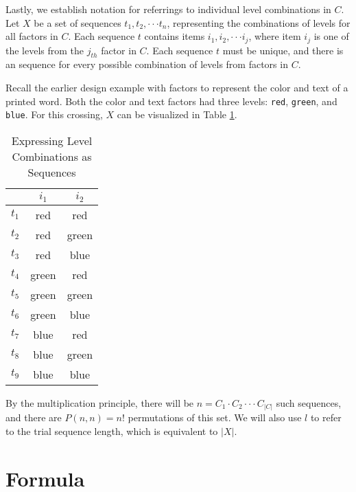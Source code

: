 Lastly, we establish notation for referrings to individual level combinations in $C$. Let $X$ be a set of sequences $t_1, t_2, \cdot\cdot\cdot t_n$, representing the combinations of levels for all factors in $C$. Each sequence $t$ contains items $i_1, i_2, \cdot\cdot\cdot i_j$, where item $i_j$ is one of the levels from the $j_{th}$ factor in $C$. Each sequence $t$ must be unique, and there is an sequence for every possible combination of levels from factors in $C$.

Recall the earlier design example with factors to represent the color and text of a printed word. Both the color and text factors had three levels: \texttt{red}, \texttt{green}, and \texttt{blue}. For this crossing, $X$ can be visualized in Table \ref{tab:sequences}.

\begin{table}[htb]
  \centering
  \caption{Expressing Level Combinations as Sequences}
\begin{tabular}{|c|cc|}
\hline
\textbf{}      & \textbf{$i_1$} & \textbf{$i_2$} \\ \hline
\textbf{$t_1$} & red            & red            \\
\textbf{$t_2$} & red            & green          \\
\textbf{$t_3$} & red            & blue           \\
\textbf{$t_4$} & green          & red            \\
\textbf{$t_5$} & green          & green          \\
\textbf{$t_6$} & green          & blue           \\
\textbf{$t_7$} & blue           & red            \\
\textbf{$t_8$} & blue           & green          \\
\textbf{$t_9$} & blue           & blue           \\   \hline
\end{tabular}
\label{tab:sequences}
\end{table}

By the multiplication principle, there will be $n = C_1 \cdot C_2 \cdot\cdot\cdot C_{|C|}$ such sequences, and there are $P(n, n) = n!$ permutations of this set. We will also use $l$ to refer to the trial sequence length, which is equivalent to $|X|$.


\section{Formula}

